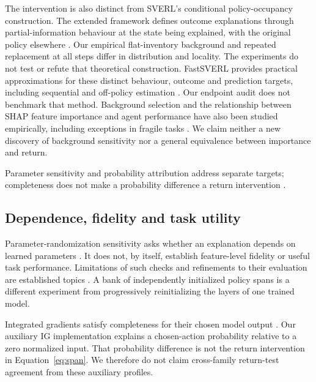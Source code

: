 \documentclass[10pt,twocolumn]{article}
\begin{document}
The intervention is also distinct from SVERL's conditional policy-occupancy
construction. The extended framework defines outcome explanations through
partial-information behaviour at the state being explained, with the original
policy elsewhere \citep{beechey2025}. Our empirical flat-inventory background
and repeated replacement at all steps differ in distribution and locality.
The experiments do not test or refute that theoretical construction.
FastSVERL provides practical approximations for these distinct behaviour,
outcome and prediction targets, including sequential and off-policy estimation
\citep{beecheyfast2025}. Our endpoint audit does not benchmark that method.
Background selection and the relationship between SHAP feature importance and
agent performance have also been studied empirically, including exceptions in
fragile tasks \citep{engelhardt2024}. We claim neither a new discovery of
background sensitivity nor a general equivalence between importance and return.

\ifdefined\shortversion
Parameter sensitivity and probability attribution address separate targets;
completeness does not make a probability difference a return intervention
\citep{adebayo2018,sundararajan2017}.
\else
\subsection{Dependence, fidelity and task utility}
Parameter-randomization sensitivity asks whether an explanation depends on
learned parameters \citep{adebayo2018}. It does not, by itself, establish
feature-level fidelity or useful task performance. Limitations of such checks
and refinements to their evaluation are established topics
\citep{binder2022,hedstrom2024}. A bank of independently initialized policy
spans is a different experiment from progressively reinitializing the layers
of one trained model.

Integrated gradients satisfy completeness for their chosen model output
\citep{sundararajan2017}. Our auxiliary IG implementation explains a
chosen-action probability relative to a zero normalized input. That
probability difference is not the return intervention in
Equation~\ref{eq:span}. We therefore do not claim cross-family return-test
agreement from these auxiliary profiles.
\fi
\end{document}
